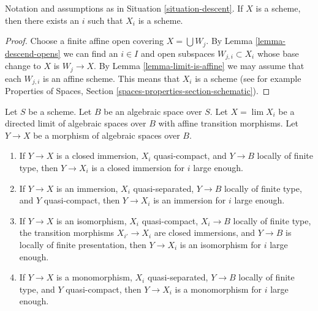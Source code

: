 \begin{lemma}
\label{lemma-limit-is-scheme}
Notation and assumptions as in Situation \ref{situation-descent}.
If $X$ is a scheme, then there exists an $i$ such that $X_i$ is a scheme.
\end{lemma}

\begin{proof}
Choose a finite affine open covering $X = \bigcup W_j$.
By Lemma \ref{lemma-descend-opens}
we can find an $i \in I$ and open subspaces $W_{j, i} \subset X_i$
whose base change to $X$ is $W_j \to X$. By
Lemma \ref{lemma-limit-is-affine} we may assume that
each $W_{j, i}$ is an affine scheme. This means that $X_i$
is a scheme (see for example
Properties of Spaces, Section \ref{spaces-properties-section-schematic}).
\end{proof}

\begin{lemma}
\label{lemma-finite-type-eventually-closed}
Let $S$ be a scheme. Let $B$ be an algebraic space over $S$.
Let $X = \lim X_i$ be a directed limit of
algebraic spaces over $B$ with affine transition morphisms.
Let $Y \to X$ be a morphism of algebraic spaces over $B$.
\begin{enumerate}
\item If $Y \to X$ is a closed immersion, $X_i$ quasi-compact, and
$Y \to B$ locally of finite type, then $Y \to X_i$ is a closed immersion
for $i$ large enough.
\item If $Y \to X$ is an immersion, $X_i$ quasi-separated, $Y \to B$
locally of finite type, and $Y$ quasi-compact, then $Y \to X_i$ is an
immersion for $i$ large enough.
\item If $Y \to X$ is an isomorphism, $X_i$ quasi-compact,
$X_i \to B$ locally of finite type, the transition morphisms
$X_{i'} \to X_i$ are closed immersions, and $Y \to B$ is locally
of finite presentation, then $Y \to X_i$ is an isomorphism for $i$
large enough.
\item If $Y \to X$ is a monomorphism, $X_i$ quasi-separated,
$Y \to B$ locally of finite type, and $Y$ quasi-compact, then
$Y \to X_i$ is a monomorphism for $i$ large enough.
\end{enumerate}
\end{lemma}

